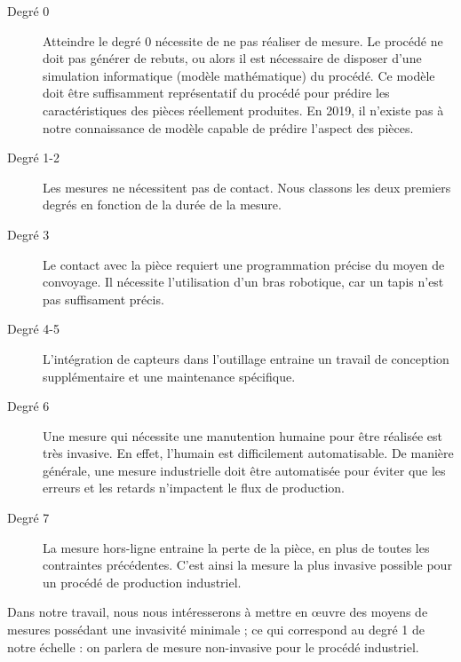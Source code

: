 \begin{description}
	\item[Degré 0] Atteindre le degré 0 nécessite de ne pas réaliser de mesure.
	Le procédé ne doit pas générer de rebuts, ou alors il est nécessaire de disposer d'une simulation informatique (modèle mathématique) du procédé.
	Ce modèle doit être suffisamment représentatif du procédé pour prédire les caractéristiques des pièces réellement produites.
	En 2019, il n'existe pas à notre connaissance de modèle capable de prédire l'aspect des pièces.
	\item[Degré 1-2] Les mesures ne nécessitent pas de contact. Nous classons les deux premiers degrés en fonction de la durée de la mesure.
	\item[Degré 3] Le contact avec la pièce requiert une programmation précise du moyen de convoyage.
	Il nécessite l'utilisation d'un bras robotique, car un tapis n'est pas suffisament précis.
	\item[Degré 4-5] L'intégration de capteurs dans l'outillage entraine un travail de conception supplémentaire et une maintenance spécifique.
	\item[Degré 6] Une mesure qui nécessite une manutention humaine pour être réalisée est très invasive.
	En effet, l'humain est difficilement automatisable.
	De manière générale, une mesure industrielle doit être automatisée pour éviter que les erreurs et les retards n'impactent le flux de production.
	\item[Degré 7] La mesure hors-ligne entraine la perte de la pièce, en plus de toutes les contraintes précédentes. C'est ainsi la mesure la plus invasive possible pour un procédé de production industriel.
\end{description} 

\noindent
Dans notre travail, nous nous intéresserons à mettre en œuvre des moyens de mesures possédant une invasivité minimale ; ce qui correspond au degré 1 de notre échelle : on parlera de mesure non-invasive pour le procédé industriel.


